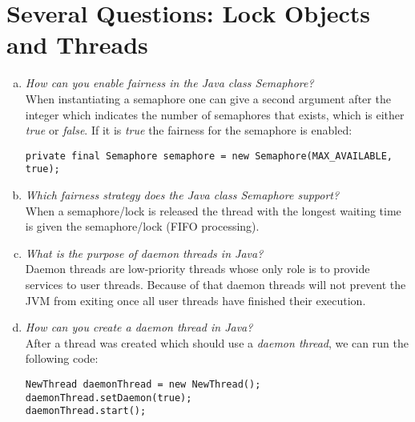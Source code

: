 \documentclass{report}
\begin{document}
	\section{Several Questions: Lock Objects and Threads}
	\startsection
		\begin{enumerate}[a)]
			\item \textit{How can you enable fairness in the Java class Semaphore?} \\
			When instantiating a semaphore one can give a second argument after the integer which indicates the number of semaphores that exists, which is either \textit{true} or \textit{false}. If it is \textit{true} the fairness for the semaphore is enabled:
			\begin{verbatim}
private final Semaphore semaphore = new Semaphore(MAX_AVAILABLE, true);		
			\end{verbatim}
			\item \textit{Which fairness strategy does the Java class Semaphore support?} \\
			When a semaphore/lock is released the thread with the longest waiting time is given the semaphore/lock (FIFO processing).
			\item \textit{What is the purpose of daemon threads in Java?} \\
			Daemon threads are low-priority threads whose only role is to provide services to user threads. Because of that daemon threads will not prevent the JVM from exiting once all user threads have finished their execution.
			\item \textit{How can you create a daemon thread in Java?} \\
			After a thread was created which should use a \textit{daemon thread}, we can run the following code:
			\begin{verbatim}
NewThread daemonThread = new NewThread();
daemonThread.setDaemon(true);
daemonThread.start();
			\end{verbatim}
		\end{enumerate}
	\closesection
\end{document}
